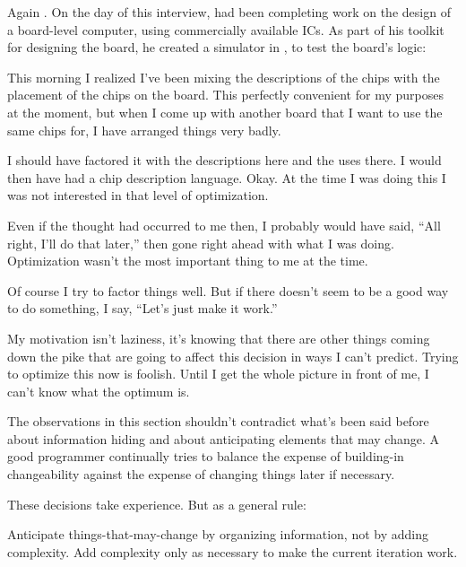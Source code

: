 \begin{interview}
Again . On the day of this
interview,  had been completing work on the design of a
board-level \Forth{} computer, using commercially available ICs. As
part of his toolkit for designing the board, he created a simulator in
\Forth{}, to test the board's logic:

\begin{tfquot}
This morning I realized I've been mixing the descriptions of the chips
with the placement of the chips on the board. This perfectly
convenient for my purposes at the moment, but when I come up with
another board that I want to use the same chips for, I have arranged
things very badly.

I should have factored it with the descriptions here and the uses
there. I would then have had a chip description language. Okay. At the
time I was doing this I was not interested in that level of
optimization.

Even if the thought had occurred to me then, I probably would have
said, ``All right, I'll do that later,'' then gone right ahead with
what I was doing. Optimization wasn't the most important thing to me
at the time.

Of course I try to factor things well. But if there doesn't seem to be
a good way to do something, I say, ``Let's just make it work.''

My motivation isn't laziness, it's knowing that there are other things
coming down the pike that are going to affect this decision in ways I
can't predict. Trying to optimize this now is foolish. Until I get the
whole picture in front of me, I can't know what the optimum is.
\end{tfquot}
\end{interview}
The observations in this section shouldn't contradict what's been said
before about information hiding and about anticipating elements that
may change. A good programmer continually tries to balance the expense
of building-in changeability against the expense of changing things
later if necessary.

These decisions take experience. But as a general rule:

\begin{tip}
Anticipate things-that-may-change by organizing information, not by
adding complexity. Add complexity only as necessary to make the
current iteration work.
\end{tip}

